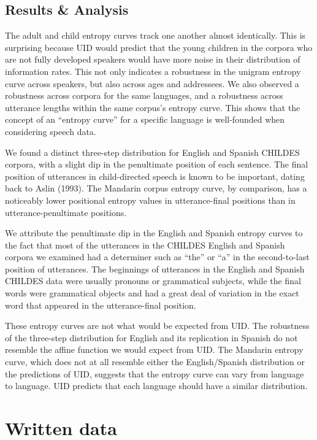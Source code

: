 \documentclass[10pt, letterpaper]{article}
\begin{document}
\subsection{Results \& Analysis}\label{results-analysis}

The adult and child entropy curves track one another almost identically.
This is surprising because UID would predict that the young children in
the corpora who are not fully developed speakers would have more noise
in their distribution of information rates. This not only indicates a
robustness in the unigram entropy curve across speakers, but also across
ages and addressees. We also observed a robustness across corpora for
the same languages, and a robustness across utterance lengths within the
same corpus's entropy curve. This shows that the concept of an ``entropy
curve'' for a specific language is well-founded when considering speech
data.

We found a distinct three-step distribution for English and Spanish
CHILDES corpora, with a slight dip in the penultimate position of each
sentence. The final position of utterances in child-directed speech is
known to be important, dating back to Aslin (1993). The Mandarin corpus
entropy curve, by comparison, has a noticeably lower positional entropy
values in utterance-final positions than in utterance-penultimate
positions.

We attribute the penultimate dip in the English and Spanish entropy
curves to the fact that most of the utterances in the CHILDES English
and Spanish corpora we examined had a determiner such as ``the'' or
``a'' in the second-to-last position of utterances. The beginnings of
utterances in the English and Spanish CHILDES data were usually pronouns
or grammatical subjects, while the final words were grammatical objects
and had a great deal of variation in the exact word that appeared in the
utterance-final position.

These entropy curves are not what would be expected from UID. The
robustness of the three-step distribution for English and its
replication in Spanish do not resemble the affine function we would
expect from UID. The Mandarin entropy curve, which does not at all
resemble either the English/Spanish distribution or the predictions of
UID, suggests that the entropy curve can vary from language to language.
UID predicts that each language should have a similar distribution.

\section{Written data}\label{written-data}
\end{document}
